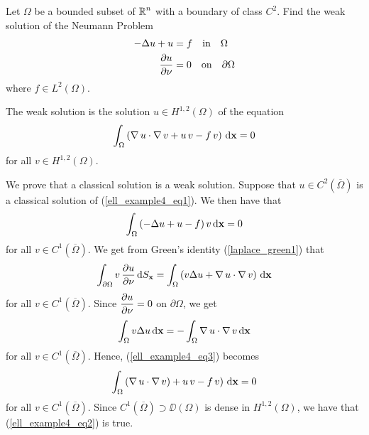 \begin{egg}
Let $\Omega$ be a bounded subset of $\displaystyle \mathbb{R}^n$ with a
boundary of class $\displaystyle C^2$.
Find the weak solution of the Neumann Problem          \label{eggNewmanBdr}
\begin{equation} \label{ell_example4_eq1}
\begin{split}
-\Delta u + u &= f \quad \text{in} \quad \Omega \\
\frac{\partial{u}}{\partial \mathbf{\nu}} &= 0 \quad \text{on} \quad \partial \Omega
\end{split}
\end{equation}
where $\displaystyle f \in L^2(\Omega)$.

The weak solution is the solution $\displaystyle u\in H^{1,2}(\Omega)$ of
the equation
\begin{equation} \label{ell_example4_eq2}
\int_\Omega \left( \operatorname{\nabla} u \cdot \operatorname{\nabla} v
+ u\, v - f\, v \right) \,\mathrm{d}{\mathbf{x}} = 0
\end{equation}
for all $\displaystyle v \in H^{1,2}(\Omega)$.

We prove that a classical solution is a weak solution.  Suppose that
$\displaystyle u \in C^2(\overline{\Omega})$ is a classical solution of
(\ref{ell_example4_eq1}).  We then have that
\begin{equation} \label{ell_example4_eq3}
\int_\Omega \left( -\Delta u + u - f\right)
v \,\mathrm{d}{\mathbf{x}} = 0
\end{equation}
for all $\displaystyle v \in C^1(\overline{\Omega})$.
We get from Green's identity (\ref{laplace_green1}) that
\[
\int_{\partial \Omega} v\,\frac{\partial{u}}{\partial \mathbf{\nu}} \,\mathrm{d}{S}_{\mathbf{x}}
= \int_\Omega \left( v \Delta u + \operatorname{\nabla} u \cdot \operatorname{\nabla} v \right)
\,\mathrm{d}{\mathbf{x}}
\]
for all $\displaystyle v \in C^1(\overline{\Omega})$.
Since $\displaystyle \frac{\partial{u}}{\partial \mathbf{\nu}} = 0$ on $\partial \Omega$, we
get
\[
\int_\Omega  v \Delta u \,\mathrm{d}{\mathbf{x}} =
- \int_\Omega \operatorname{\nabla} u \cdot \operatorname{\nabla} v \,\mathrm{d}{\mathbf{x}}
\]
for all $\displaystyle v \in C^1(\overline{\Omega})$.
Hence, (\ref{ell_example4_eq3}) becomes
\[
\int_\Omega \left( \operatorname{\nabla} u \cdot \operatorname{\nabla} v) + u\, v
 - f\, v\right) \,\mathrm{d}{\mathbf{x}} = 0
\]
for all $\displaystyle v \in C^1(\overline{\Omega})$.
Since $\displaystyle C^1(\overline{\Omega}) \supset \DD(\Omega)$ is
dense in $\displaystyle H^{1,2}(\Omega)$, we
have that (\ref{ell_example4_eq2}) is true.


\end{egg}
